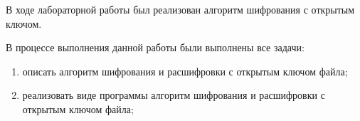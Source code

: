 
В ходе лабораторной работы был реализован алгоритм шифрования с открытым ключом.

В процессе выполнения данной работы были выполнены все задачи:
\begin{enumerate}[label={\arabic*)}]
	\item описать алгоритм шифрования и расшифровки с открытым ключом файла;
	\item реализовать виде программы алгоритм шифрования и расшифровки с открытым ключом файла;
\end{enumerate}
